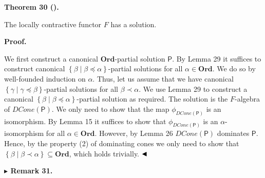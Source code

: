  
 
\par\medskip\noindent\textbf{Theorem 30 ().}\par
 
 
The locally contractive functor $F$ has a solution.\par
 
 
 
 
 
\par\medskip\noindent\textbf{Proof.}\par
 
 
We first construct a canonical $\mathbf{Ord}$-partial solution $\boldsymbol{\mathsf{P}}$. By Lemma 29 it suffices to construct canonical $\left\{\beta\middle|\beta\preceq\alpha\right\}$-partial solutions for all $\alpha\in\mathbf{Ord}$. We do so by well-founded induction on $\alpha$. Thus, let us assume that we have canonical $\left\{\gamma\middle|\gamma\preceq\beta\right\}$-partial solutions for all $\beta\prec\alpha$. We use Lemma 29 to construct a canonical $\left\{\beta\middle|\beta\preceq\alpha\right\}$-partial solution as required. The solution is the $F$-algebra of $\mathit{DCone}(\boldsymbol{\mathsf{P}})$. We only need to show that the map $\phi_{\mathit{DCone}(\boldsymbol{\mathsf{P}})}$ is an isomorphism. By Lemma 15 it suffices to show that $\phi_{\mathit{DCone}(\boldsymbol{\mathsf{P}})}$ is an $\alpha$-isomorphism for all $\alpha\in\mathbf{Ord}$. However, by Lemma 26 $\mathit{DCone}(\boldsymbol{\mathsf{P}})$ dominates $\boldsymbol{\mathsf{P}}$. Hence, by the property (2) of dominating cones we only need to show that $\left\{\beta\middle|\beta\prec\alpha\right\}\subseteq\mathbf{Ord}$, which holds trivially. $\hfill\blacktriangleleft$\par
 
 
 
\par\medskip\noindent\textbf{$\blacktriangleright$ Remark 31.}\par
 
 
